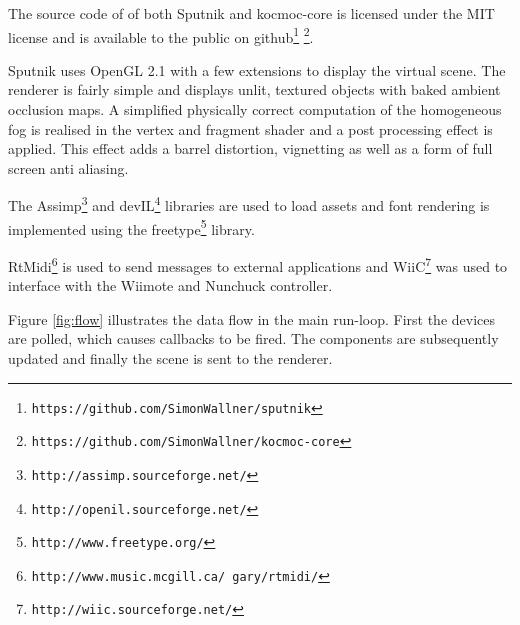 \documentclass[10pt,a4paper]{scrartcl}
\begin{document}
The source code of of both Sputnik and kocmoc-core is licensed under the MIT license and is available to the public on github\footnote{\texttt{https://github.com/SimonWallner/sputnik}} \footnote{\texttt{https://github.com/SimonWallner/kocmoc-core}}.

Sputnik uses OpenGL 2.1 with a few extensions to display the virtual scene. The renderer is fairly simple and displays unlit, textured objects with baked ambient occlusion maps. A simplified physically correct computation of the homogeneous fog is realised in the vertex and fragment shader and a post processing effect is applied. This effect adds a barrel distortion, vignetting as well as a form of full screen anti aliasing.

The Assimp\footnote{\texttt{http://assimp.sourceforge.net/}} and devIL\footnote{\texttt{http://openil.sourceforge.net/}} libraries are used to load assets and font rendering is implemented using the freetype\footnote{\texttt{http://www.freetype.org/}} library.

RtMidi\footnote{\texttt{http://www.music.mcgill.ca/~gary/rtmidi/}} is used to send messages to external applications and WiiC\footnote{\texttt{http://wiic.sourceforge.net/}} was used to interface with the Wiimote and Nunchuck controller.

Figure \ref{fig:flow} illustrates the data flow in the main run-loop. First the devices are polled, which causes callbacks to be fired. The components are subsequently updated and finally the scene is sent to the renderer.
\end{document}
